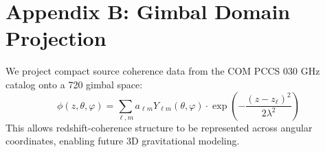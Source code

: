 \documentclass[12pt]{article}
\begin{document}
\section*{Appendix B: Gimbal Domain Projection}
We project compact source coherence data from the COM PCCS 030 GHz catalog onto a 720\textdegree{} gimbal space:
\[
\phi(z, \theta, \varphi) = \sum_{\ell, m} a_{\ell m} Y_{\ell m}(\theta, \varphi) \cdot \exp\left( -\frac{(z - z_\ell)^2}{2\lambda^2} \right)
\]
This allows redshift-coherence structure to be represented across angular coordinates, enabling future 3D gravitational modeling.
\end{document}
